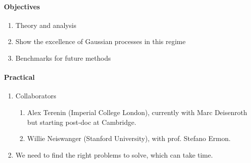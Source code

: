 \paragraph{Objectives}
\begin{enumerate}
    \item Theory and analysis
    \item Show the excellence of Gaussian processes in this regime
    \item Benchmarks for future methods
\end{enumerate}

\paragraph{Practical}
\begin{enumerate}
    \item Collaborators
    \begin{enumerate}
    \item Alex Terenin (Imperial College London), currently with Marc Deisenroth but starting post-doc at Cambridge.
    \item Willie Neiswanger (Stanford University), with prof. Stefano Ermon.
    \end{enumerate}
    \item We need to find the right problems to solve, which can take time.
\end{enumerate}





